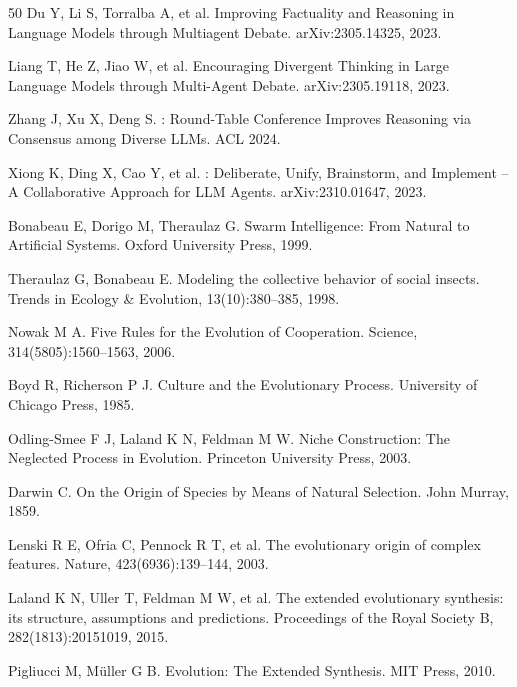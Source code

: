 \documentclass[twocolumn,10.5pt]{ctexart}
\begin{document}
\begin{thebibliography}{50}
Du Y, Li S, Torralba A, et al.
\newblock Improving Factuality and Reasoning in Language Models through Multiagent Debate.
\newblock arXiv:2305.14325, 2023.

Liang T, He Z, Jiao W, et al.
\newblock Encouraging Divergent Thinking in Large Language Models through Multi-Agent Debate.
\newblock arXiv:2305.19118, 2023.

Zhang J, Xu X, Deng S.
: Round-Table Conference Improves Reasoning via Consensus among Diverse LLMs.
\newblock ACL 2024.

Xiong K, Ding X, Cao Y, et al.
: Deliberate, Unify, Brainstorm, and Implement -- A Collaborative Approach for LLM Agents.
\newblock arXiv:2310.01647, 2023.

Bonabeau E, Dorigo M, Theraulaz G.
\newblock Swarm Intelligence: From Natural to Artificial Systems.
\newblock Oxford University Press, 1999.

Theraulaz G, Bonabeau E.
\newblock Modeling the collective behavior of social insects.
\newblock Trends in Ecology \& Evolution, 13(10):380--385, 1998.

Nowak M A.
\newblock Five Rules for the Evolution of Cooperation.
\newblock Science, 314(5805):1560--1563, 2006.

Boyd R, Richerson P J.
\newblock Culture and the Evolutionary Process.
\newblock University of Chicago Press, 1985.

Odling-Smee F J, Laland K N, Feldman M W.
\newblock Niche Construction: The Neglected Process in Evolution.
\newblock Princeton University Press, 2003.

Darwin C.
\newblock On the Origin of Species by Means of Natural Selection.
\newblock John Murray, 1859.

Lenski R E, Ofria C, Pennock R T, et al.
\newblock The evolutionary origin of complex features.
\newblock Nature, 423(6936):139--144, 2003.

Laland K N, Uller T, Feldman M W, et al.
\newblock The extended evolutionary synthesis: its structure, assumptions and predictions.
\newblock Proceedings of the Royal Society B, 282(1813):20151019, 2015.

Pigliucci M, M{\"u}ller G B.
\newblock Evolution: The Extended Synthesis.
\newblock MIT Press, 2010.


\end{thebibliography}
\end{document}
